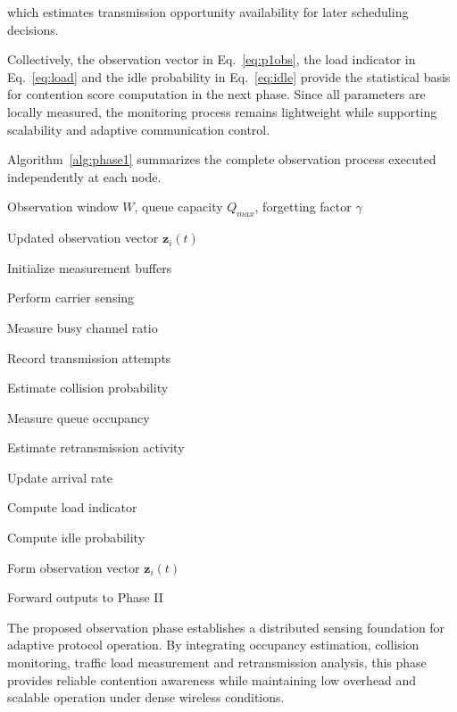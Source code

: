 \documentclass[a4paper,fleqn,final,1p]{cas-dc}
\numberwithin{equation}{section}
\begin{document}
which estimates transmission opportunity availability for later scheduling decisions.

Collectively, the observation vector in Eq.~\ref{eq:p1obs}, the load indicator in Eq.~\ref{eq:load} and the idle probability in Eq.~\ref{eq:idle} provide the statistical basis for contention score computation in the next phase. Since all parameters are locally measured, the monitoring process remains lightweight while supporting scalability and adaptive communication control.

Algorithm~\ref{alg:phase1} summarizes the complete observation process executed independently at each node.

\begin{algorithm}[H]
\caption{Phase I Channel Observation Procedure}
\label{alg:phase1}
\begin{algorithmic}[1]

\Require
Observation window $W$,
queue capacity $Q_{max}$,
forgetting factor $\gamma$

\Ensure
Updated observation vector $\mathbf z_i(t)$

\State Initialize measurement buffers


\State Perform carrier sensing

\State Measure busy channel ratio

\State Record transmission attempts

\State Estimate collision probability

\State Measure queue occupancy

\State Estimate retransmission activity

\State Update arrival rate

\State Compute load indicator

\State Compute idle probability

\State Form observation vector
$\mathbf z_i(t)$

\State Forward outputs to Phase II

\EndFor

\end{algorithmic}
\end{algorithm}

The proposed observation phase establishes a distributed sensing foundation for adaptive protocol operation. By integrating occupancy estimation, collision monitoring, traffic load measurement and retransmission analysis, this phase provides reliable contention awareness while maintaining low overhead and scalable operation under dense wireless conditions.
\end{document}
